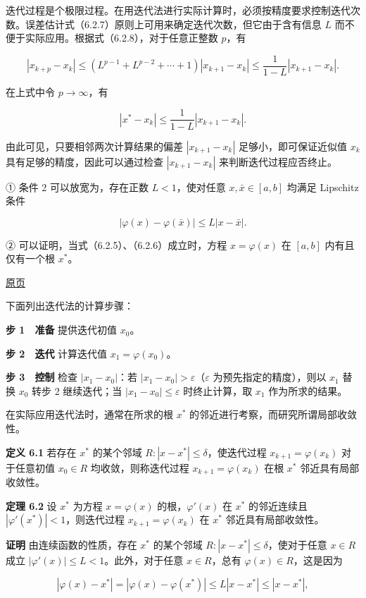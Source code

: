 \documentclass[
  10pt,
  fontset=fandol]{ctexart}
\begin{document}
迭代过程是个极限过程。在用迭代法进行实际计算时，必须按精度要求控制迭代次数。误差估计式（6.2.7）原则上可用来确定迭代次数，但它由于含有信息 \(L\) 而不便于实际应用。根据式（6.2.8），对于任意正整数 \(p\)，有

\[
|x_{k+p}-x_k|\leqslant(L^{p-1}+L^{p-2}+\cdots+1)|x_{k+1}-x_k|\leqslant\frac{1}{1-L}|x_{k+1}-x_k|.
\]

在上式中令 \(p\to\infty\)，有

\[
|x^*-x_k|\leqslant\frac{1}{1-L}|x_{k+1}-x_k|.
\]

由此可见，只要相邻两次计算结果的偏差 \(|x_{k+1}-x_k|\) 足够小，即可保证近似值 \(x_k\) 具有足够的精度，因此可以通过检查 \(|x_{k+1}-x_k|\) 来判断迭代过程应否终止。

① 条件 2 可以放宽为，存在正数 \(L<1\)，使对任意 \(x,\bar{x}\in[a,b]\) 均满足 Lipschitz 条件

\[
|\varphi(x)-\varphi(\bar{x})|\leqslant L|x-\bar{x}|.
\]

② 可以证明，当式（6.2.5）、（6.2.6）成立时，方程 \(x=\varphi(x)\) 在 \([a,b]\) 内有且仅有一个根 \(x^*\)。

\href{../../source-images/pdf-160.jpeg}{原页}

下面列出迭代法的计算步骤：

\textbf{步 1　准备} 提供迭代初值 \(x_0\)。

\textbf{步 2　迭代} 计算迭代值 \(x_1=\varphi(x_0)\)。

\textbf{步 3　控制} 检查 \(|x_1-x_0|\)：若 \(|x_1-x_0|>\varepsilon\)（\(\varepsilon\) 为预先指定的精度），则以 \(x_1\) 替换 \(x_0\) 转步 2 继续迭代；当 \(|x_1-x_0|\leqslant\varepsilon\) 时终止计算，取 \(x_1\) 作为所求的结果。

在实际应用迭代法时，通常在所求的根 \(x^*\) 的邻近进行考察，而研究所谓局部收敛性。

\textbf{定义 6.1} 若存在 \(x^*\) 的某个邻域 \(R:|x-x^*|\leqslant\delta\)，使迭代过程 \(x_{k+1}=\varphi(x_k)\) 对于任意初值 \(x_0\in R\) 均收敛，则称迭代过程 \(x_{k+1}=\varphi(x_k)\) 在根 \(x^*\) 邻近具有局部收敛性。

\textbf{定理 6.2} 设 \(x^*\) 为方程 \(x=\varphi(x)\) 的根，\(\varphi'(x)\) 在 \(x^*\) 的邻近连续且 \(|\varphi'(x^*)|<1\)，则迭代过程 \(x_{k+1}=\varphi(x_k)\) 在 \(x^*\) 邻近具有局部收敛性。

\textbf{证明} 由连续函数的性质，存在 \(x^*\) 的某个邻域 \(R:|x-x^*|\leqslant\delta\)，使对于任意 \(x\in R\) 成立 \(|\varphi'(x)|\leqslant L<1\)。此外，对于任意 \(x\in R\)，总有 \(\varphi(x)\in R\)，这是因为

\[
|\varphi(x)-x^*|=|\varphi(x)-\varphi(x^*)|\leqslant L|x-x^*|\leqslant|x-x^*|,
\]
\end{document}
